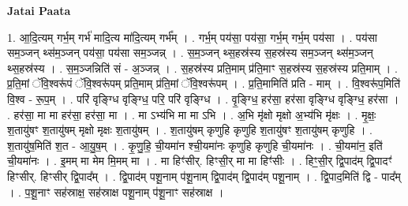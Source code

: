 \documentclass[17pt]{extarticle}
\begin{document}
\textbf{Jatai Paata} \newline

1. आ॒दि॒त्यम् गर्भ॒म् गर्भ॑ मादि॒त्य मा॑दि॒त्यम् गर्भ᳚म् । . गर्भ॒म् पय॑सा॒ पय॑सा॒ गर्भ॒म् गर्भ॒म् पय॑सा । . पय॑सा सम॒ञ्जन् थ्स॑म॒ञ्जन् पय॑सा॒ पय॑सा सम॒ञ्जन्न् । . स॒म॒ञ्जन् थ्स॒हस्र॑स्य स॒हस्र॑स्य सम॒ञ्जन् थ्स॑म॒ञ्जन् थ्स॒हस्र॑स्य । . स॒म॒ञ्जन्निति॑ सं - अ॒ञ्जन्न् । . स॒हस्र॑स्य प्रति॒माम् प्र॑ति॒माꣳ स॒हस्र॑स्य स॒हस्र॑स्य प्रति॒माम् । . प्र॒ति॒मां ॅवि॒श्वरू॑पं ॅवि॒श्वरू॑पम् प्रति॒माम् प्र॑ति॒मां ॅवि॒श्वरू॑पम् । . प्र॒ति॒मामिति॑ प्रति - माम् । . वि॒श्वरू॑प॒मिति॑ वि॒श्व - रू॒प॒म् । . परि॑ वृङ्ग्धि वृङ्ग्धि॒ परि॒ परि॑ वृङ्ग्धि । . वृ॒ङ्ग्धि॒ हर॑सा॒ हर॑सा वृङ्ग्धि वृङ्ग्धि॒ हर॑सा । . हर॑सा॒ मा मा हर॑सा॒ हर॑सा॒ मा । . मा ऽभ्य॑भि मा मा ऽभि । . अ॒भि मृ॑क्षो मृक्षो अ॒भ्य॑भि मृ॑क्षः । . मृ॒क्षः॒ श॒तायु॑षꣳ श॒तायु॑षम् मृक्षो मृक्षः श॒तायु॑षम् । . श॒तायु॑षम् कृणुहि कृणुहि श॒तायु॑षꣳ श॒तायु॑षम् कृणुहि । . श॒तायु॑ष॒मिति॑ श॒त - आ॒यु॒ष॒म् । . कृ॒णु॒हि॒ ची॒यमा॑न श्ची॒यमा॑नः कृणुहि कृणुहि ची॒यमा॑नः । . ची॒यमा॑न॒ इति॑ ची॒यमा॑नः । . इ॒मम् मा मेम मि॒मम् मा । . मा हिꣳ॑सीर्. हिꣳसी॒र् मा मा हिꣳ॑सीः । . हिꣳ॒॒सी॒र् द्वि॒पाद॑म् द्वि॒पादꣳ॑ हिꣳसीर्. हिꣳसीर् द्वि॒पाद᳚म् । . द्वि॒पाद॑म् पशू॒नाम् प॑शू॒नाम् द्वि॒पाद॑म् द्वि॒पाद॑म् पशू॒नाम् । . द्वि॒पाद॒मिति॑ द्वि - पाद᳚म् । . प॒शू॒नाꣳ सह॑स्राक्ष॒ सह॑स्राक्ष पशू॒नाम् प॑शू॒नाꣳ सह॑स्राक्ष । \newline
\end{document}
